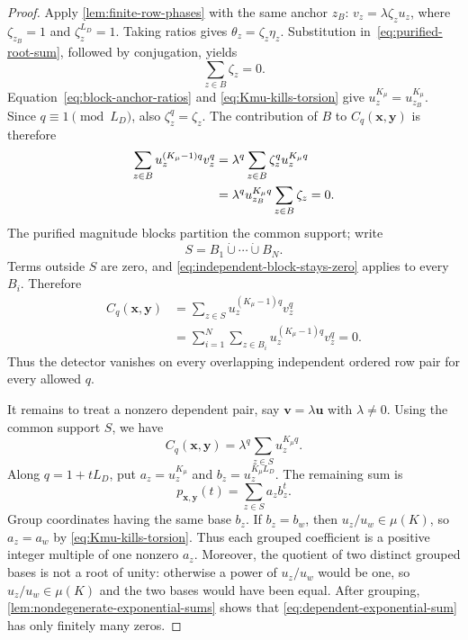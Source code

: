 \documentclass[11pt]{article}
\theoremstyle{plain}
\theoremstyle{definition}
\theoremstyle{remark}
\begin{document}
\begin{proof}
Apply \cref{lem:finite-row-phases} with the same anchor $z_B$:
$v_z=\lambda\zeta_z u_z$, where $\zeta_{z_B}=1$ and
$\zeta_z^{L_D}=1$.  Taking ratios gives $\theta_z=\zeta_z\eta_z$.
Substitution in~\eqref{eq:purified-root-sum}, followed by conjugation, yields
\begin{equation*}
  \sum_{z\in B}\zeta_z=0.
\end{equation*}
Equation~\eqref{eq:block-anchor-ratios} and
\eqref{eq:Kmu-kills-torsion} give
$u_z^{K_\mu}=u_{z_B}^{K_\mu}$.  Since $q\equiv1\pmod{L_D}$, also
$\zeta_z^q=\zeta_z$.  The contribution of $B$ to
$C_q(\mathbf x,\mathbf y)$ is therefore
\begin{align}
  \sum_{z\in B}u_z^{(K_\mu-1)q}v_z^q
  &=\lambda^q\sum_{z\in B}\zeta_z^q u_z^{K_\mu q}\notag\\
  &=\lambda^q u_{z_B}^{K_\mu q}\sum_{z\in B}\zeta_z
   =0.
  \label{eq:independent-block-stays-zero}
\end{align}
The purified magnitude blocks partition the common support; write
\[
  S=B_1\mathbin{\dot\cup}\cdots\mathbin{\dot\cup}B_N.
\]
Terms outside $S$ are zero, and
\eqref{eq:independent-block-stays-zero} applies to every $B_i$.  Therefore
\begin{equation*}
\begin{aligned}
  C_q(\mathbf x,\mathbf y)
  &=\sum_{z\in S}u_z^{(K_\mu-1)q}v_z^q\\
  &=\sum_{i=1}^N
      \sum_{z\in B_i}u_z^{(K_\mu-1)q}v_z^q
    =0.
\end{aligned}
\end{equation*}
Thus the detector vanishes on every overlapping independent ordered row pair
for every allowed $q$.

It remains to treat a nonzero dependent pair, say
$\mathbf v=\lambda\mathbf u$ with $\lambda\ne0$.  Using the common support
$S$, we have
\begin{equation*}
  C_q(\mathbf x,\mathbf y)
   =\lambda^q\sum_{z\in S}u_z^{K_\mu q}.
\end{equation*}
Along $q=1+tL_D$, put $a_z=u_z^{K_\mu}$ and
$b_z=u_z^{K_\mu L_D}$.  The remaining sum is
\begin{equation}
  p_{\mathbf x,\mathbf y}(t)=\sum_{z\in S}a_zb_z^t.
  \label{eq:dependent-exponential-sum}
\end{equation}
Group coordinates having the same base $b_z$.  If $b_z=b_w$, then
$u_z/u_w\in\mu(K)$, so $a_z=a_w$ by
\eqref{eq:Kmu-kills-torsion}.  Thus each grouped coefficient is a positive
integer multiple of one nonzero $a_z$.  Moreover, the quotient of two
distinct grouped bases is not a root of unity: otherwise a power of
$u_z/u_w$ would be one, so $u_z/u_w\in\mu(K)$ and the two bases would have
been equal.  After grouping,
\cref{lem:nondegenerate-exponential-sums} shows that
\eqref{eq:dependent-exponential-sum} has only finitely many zeros.


\end{proof}
\end{document}
